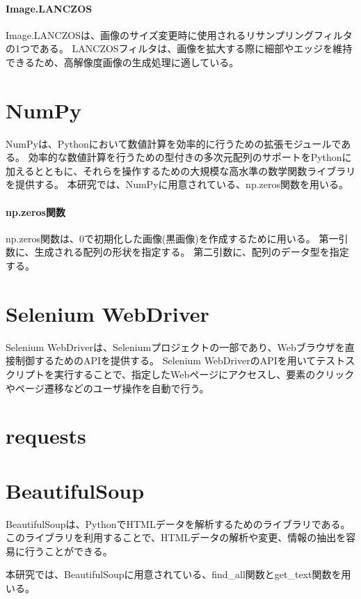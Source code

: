 \paragraph{Image.LANCZOS}
Image.LANCZOSは、画像のサイズ変更時に使用されるリサンプリングフィルタの1つである\cite{LANCZOS}。
LANCZOSフィルタは、画像を拡大する際に細部やエッジを維持できるため、高解像度画像の生成処理に適している。

\section{NumPy}\label{sec:numpy}
NumPy\cite{NumPy}は、Pythonにおいて数値計算を効率的に行うための拡張モジュールである。
効率的な数値計算を行うための型付きの多次元配列のサポートをPythonに加えるとともに、それらを操作するための大規模な高水準の数学関数ライブラリを提供する。
本研究では、NumPyに用意されている、np.zeros関数を用いる。
\paragraph{np.zeros関数}
np.zeros関数は、$0$で初期化した画像(黒画像)を作成するために用いる。
第一引数に、生成される配列の形状を指定する。
第二引数に、配列のデータ型を指定する。

\section{Selenium WebDriver}\label{sec:Selenium_WebDriver}
Selenium WebDriver\cite{Selenium WebDriver}は、Seleniumプロジェクト\cite{Selenium}の一部であり、Webブラウザを直接制御するためのAPIを提供する。
Selenium WebDriverのAPIを用いてテストスクリプトを実行することで、指定したWebページにアクセスし、要素のクリックやページ遷移などのユーザ操作を自動で行う。

\section{requests}\label{sec:requests}

\section{BeautifulSoup}\label{sec:beautifulsoup}
BeautifulSoup\cite{BeautifulSoup}は、PythonでHTMLデータを解析するためのライブラリである。
このライブラリを利用することで、HTMLデータの解析や変更、情報の抽出を容易に行うことができる。
\par
本研究では、BeautifulSoupに用意されている、find\_all関数とget\_text関数を用いる。
